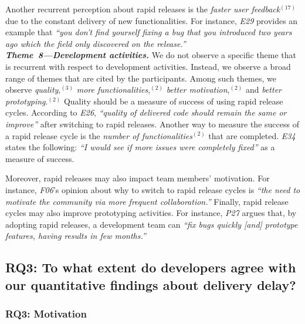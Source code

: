 {Another recurrent perception about rapid releases is the {\em faster user
feedback}$^{(17)}$ due to the constant delivery of new functionalities. For
instance, {\em E29} provides an example that {\em ``you don't find yourself
fixing a bug that you introduced two years ago which the field only discovered on the
release.''}\\

\noindent\textit{\textbf{Theme~8---Development activities.}}
We do not observe a specific theme that is recurrent with respect
to development activities. Instead, we observe a broad range of themes that are
cited by the participants. Among such themes, we observe {\em quality},$^{(3)}$
{\em more functionalities},$^{(2)}$ {\em better motivation},$^{(2)}$ and {\em
better prototyping}.$^{(2)}$ Quality should be a measure of success of using
rapid release cycles. According to {\em E26}, {\em ``quality of delivered code
should remain the same or improve''} after switching to rapid releases. Another
way to measure the success of a rapid release cycle is the {\em number of
functionalities}$^{(2)}$ that are completed. {\em E34} states the following: {\em
``I would see if more issues were completely fixed''} as a measure of success. 

Moreover, rapid releases may also impact team members' motivation. For instance,
{\em F06}'s opinion about why to switch to rapid release cycles is {\em ``the
need to motivate the community via more frequent collaboration.''} Finally,
rapid release cycles may also improve prototyping activities. For instance, {\em
P27} argues that, by adopting rapid releases, a development team can {\em ``fix
bugs quickly [and] prototype features, having results in few months.''}


\subsection{RQ3: To what extent do developers agree with our quantitative
findings about delivery delay?}\label{ch5:rq3}

\subsubsection*{RQ3: Motivation}

}
